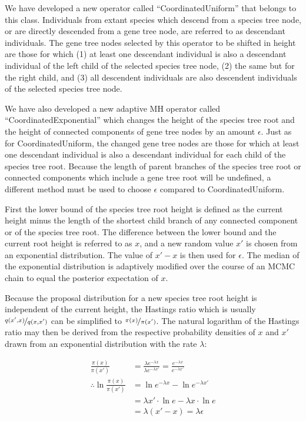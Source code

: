 \documentclass[nogrid]{MBE}%
\begin{document}
We have developed a new operator called ``CoordinatedUniform'' that belongs to
this class. Individuals from extant species which descend from a species tree
node, or are directly descended from a gene tree node, are referred to as
descendant individuals. The gene tree nodes selected by this operator to be shifted in height are those
for which (1) at least one descendant individual is also a descendant individual
of the left child of the selected species tree node, (2) the same but for the right child, and (3) all descendent
individuals are also descendent individuals of the selected species tree node.

We have also developed a new adaptive MH \citep{Andrieu2008} operator called
``CoordinatedExponential'' which changes the height of the species tree root and
the height of connected components of gene tree nodes by an amount $\epsilon$.
Just as for CoordinatedUniform, the changed gene tree nodes are those for which at least one descendant individual
is also a descendant individual for each child of the species tree root.
Because the length of parent branches of the species tree root or connected
components which include a gene tree root will be undefined, a different method must be used to choose
$\epsilon$ compared to CoordinatedUniform.

First the lower bound of the species tree root height is defined as the current
height minus the length of the shortest child branch of any connected component or
of the species tree root. The difference between the lower bound and the current
root height is referred to as $x$, and a new random value $x'$ is chosen from an
exponential distribution. The value of $x' - x$ is then used for $\epsilon$. The
median of the exponential distribution is adaptively modified over the course of
an MCMC chain to equal the posterior expectation of $x$.

Because the proposal distribution for a new species tree root height is
independent of the current height, the Hastings ratio which is usually
$\nicefrac{q(x',x)}{q(x,x')}$ \citep{Hastings1970} can be simplified to
$\nicefrac{\pi(x)}{\pi(x')}$. The natural logarithm of the Hastings ratio may then
be derived from the respective probability densities of $x$ and
$x'$ drawn from an exponential distribution with the rate $\lambda$:

\begin{align}
\frac{\pi(x)}{\pi(x')} &= \frac{\lambda e^{-\lambda x}}{\lambda e^{-\lambda x'}} = \frac{e^{-\lambda x}}{e^{-\lambda x'}}\\
\therefore \ln\frac{\pi(x)}{\pi(x')} &= \ln e^{-\lambda x} - \ln e^{-\lambda x'}\\
& = \lambda x' \cdot \ln e - \lambda x \cdot \ln e\\
& = \lambda \left(x' - x\right) = \lambda \epsilon
\end{align}
\end{document}
